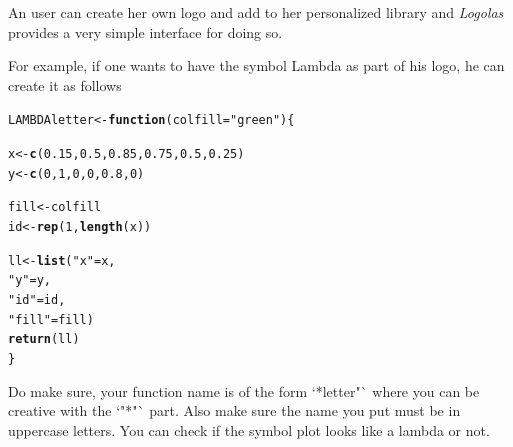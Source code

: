 \documentclass[12pt]{article}\usepackage[]{graphicx}\usepackage[usenames,dvipsnames]{color}
\makeatletter
\newcommand{\hlnum}[1]{\textcolor[rgb]{0.686,0.059,0.569}{#1}}%
\newcommand{\hlstr}[1]{\textcolor[rgb]{0.192,0.494,0.8}{#1}}%
\newcommand{\hlstd}[1]{\textcolor[rgb]{0.345,0.345,0.345}{#1}}%
\newcommand{\hlkwa}[1]{\textcolor[rgb]{0.161,0.373,0.58}{\textbf{#1}}}%
\newcommand{\hlkwb}[1]{\textcolor[rgb]{0.69,0.353,0.396}{#1}}%
\newcommand{\hlkwc}[1]{\textcolor[rgb]{0.333,0.667,0.333}{#1}}%
\newcommand{\hlkwd}[1]{\textcolor[rgb]{0.737,0.353,0.396}{\textbf{#1}}}%
\newenvironment{kframe}{%
 \def\at@end@of@kframe{}%
 \ifinner\ifhmode%
  \def\at@end@of@kframe{\end{minipage}}%
  \begin{minipage}{\columnwidth}%
 \fi\fi%
 \def\FrameCommand##1{\hskip\@totalleftmargin \hskip-\fboxsep
 \colorbox{shadecolor}{##1}\hskip-\fboxsep
     \hskip-\linewidth \hskip-\@totalleftmargin \hskip\columnwidth}%
 \MakeFramed {\advance\hsize-\width
   \@totalleftmargin\z@ \linewidth\hsize
   \@setminipage}}%
 {\par\unskip\endMakeFramed%
 \at@end@of@kframe}
\newenvironment{knitrout}{}{} %
\newcommand{\Logolas}{\textit{Logolas}}
\makeatother
\begin{document}
An user can create her own logo and add to her personalized library and \Logolas{} provides a very simple interface for doing so.

For example, if one wants to have the symbol Lambda as part of his logo,
he can create it as follows

\begin{knitrout}
\color{fgcolor}\begin{kframe}
\begin{alltt}
\hlstd{LAMBDAletter} \hlkwb{<-} \hlkwa{function}\hlstd{(}\hlkwc{colfill}\hlstd{=}\hlstr{"green"}\hlstd{)\{}

  \hlstd{x} \hlkwb{<-} \hlkwd{c}\hlstd{(}\hlnum{0.15}\hlstd{,} \hlnum{0.5}\hlstd{,} \hlnum{0.85}\hlstd{,} \hlnum{0.75}\hlstd{,} \hlnum{0.5}\hlstd{,} \hlnum{0.25}\hlstd{)}
  \hlstd{y} \hlkwb{<-} \hlkwd{c}\hlstd{(}\hlnum{0}\hlstd{,} \hlnum{1}\hlstd{,} \hlnum{0}\hlstd{,} \hlnum{0}\hlstd{,} \hlnum{0.8}\hlstd{,} \hlnum{0}\hlstd{)}

  \hlstd{fill} \hlkwb{<-} \hlstd{colfill}
  \hlstd{id} \hlkwb{<-} \hlkwd{rep}\hlstd{(}\hlnum{1}\hlstd{,} \hlkwd{length}\hlstd{(x))}

  \hlstd{ll} \hlkwb{<-} \hlkwd{list}\hlstd{(}\hlstr{"x"}\hlstd{= x,}
             \hlstr{"y"}\hlstd{= y,}
             \hlstr{"id"} \hlstd{= id,}
             \hlstr{"fill"} \hlstd{= fill)}
  \hlkwd{return}\hlstd{(ll)}
\hlstd{\}}
\end{alltt}
\end{kframe}
\end{knitrout}

Do make sure, your function name is of the form `*letter"` where you can be creative with the `"*"` part. Also make sure the name you put must be in uppercase letters. You can check if the symbol plot looks like a
lambda or not.
\end{document}
